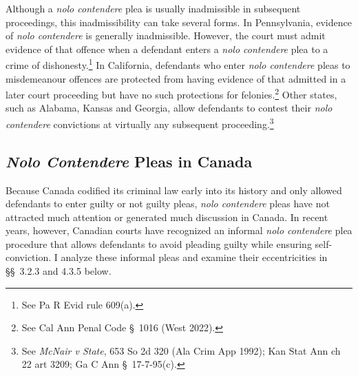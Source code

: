 Although a \textit{nolo contendere} plea is usually inadmissible in subsequent proceedings, this inadmissibility can take several forms. In Pennsylvania, evidence of \textit{nolo contendere} is generally inadmissible. However, the court must admit evidence of that offence when a defendant enters a \textit{nolo contendere} plea to a crime of dishonesty.\footnote{See Pa R Evid rule 609(a).} In California, defendants who enter \textit{nolo contendere} pleas to misdemeanour offences are protected from having evidence of that admitted in a later court proceeding but have no such protections for felonies.\footnote{See Cal Ann Penal Code § 1016 (West 2022).} Other states, such as Alabama, Kansas and Georgia, allow defendants to contest their \textit{nolo contendere} convictions at virtually any subsequent proceeding.\footnote{See \textit{McNair v State}, 653 So 2d 320 (Ala Crim App 1992); Kan Stat Ann ch 22 art 3209; Ga C Ann § 17-7-95(c).}

\subsection{\textit{Nolo Contendere} Pleas in Canada}

Because Canada codified its criminal law early into its history and only allowed defendants to enter guilty or not guilty pleas, \textit{nolo contendere} pleas have not attracted much attention or generated much discussion in Canada. In recent years, however, Canadian courts have recognized an informal \textit{nolo contendere} plea procedure that allows defendants to avoid pleading guilty while ensuring self-conviction. I analyze these informal pleas and examine their eccentricities in §§ 3.2.3 and 4.3.5 below.